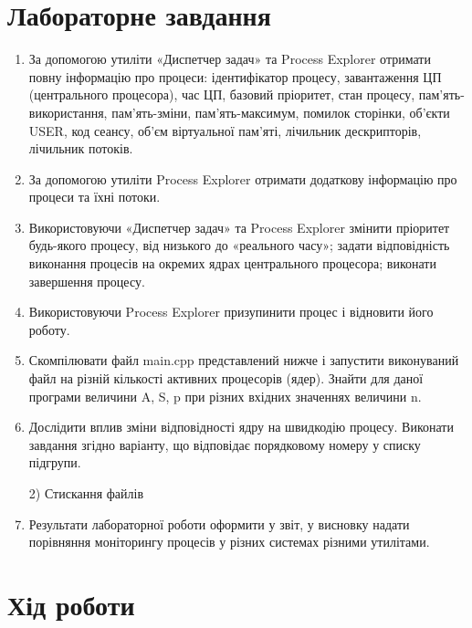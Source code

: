 \documentclass{article}
\begin{document}
\begin{normalsize}
	\section*{Лабораторне завдання}
	\begin{enumerate}
		\item За допомогою утиліти «Диспетчер задач» та Process Explorer отримати
		повну інформацію про процеси: ідентифікатор процесу, завантаження ЦП
		(центрального процесора), час ЦП, базовий пріоритет, стан процесу,
		пам'ять-використання, пам'ять-зміни, пам'ять-максимум, помилок сторінки,
		об’єкти USER, код сеансу, об’єм віртуальної пам’яті, лічильник дескрипторів,
		лічильник потоків.
		\item За допомогою утиліти Process Explorer отримати додаткову інформацію
		про процеси та їхні потоки.
		\item Використовуючи «Диспетчер задач» та Process Explorer змінити
		пріоритет будь-якого процесу, від низького до «реального часу»; задати
		відповідність виконання процесів на окремих ядрах центрального процесора;
		виконати завершення процесу.
		\item Використовуючи Process Explorer призупинити процес і відновити його
		роботу.
		\item Скомпілювати файл main.cpp представлений нижче і запустити
		виконуваний файл на різній кількості активних процесорів (ядер). Знайти для
		даної програми величини  A, S, p при різних вхідних значеннях величини n.
		\item Дослідити вплив зміни відповідності ядру на швидкодію процесу.
		Виконати завдання згідно варіанту, що відповідає порядковому номеру у
		списку підгрупи.
		\begin{center}
			2) Стискання файлів
		\end{center}
		\item Результати лабораторної роботи оформити у звіт, у висновку надати
		порівняння моніторингу процесів у різних системах різними утилітами.
	\end{enumerate}

	\section*{Хід роботи}

\end{normalsize}
\end{document}
